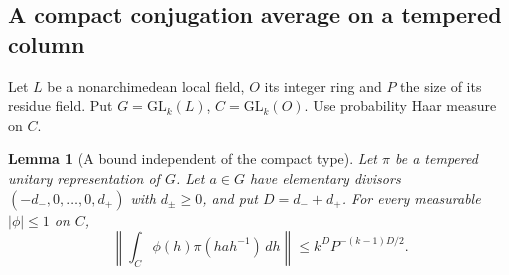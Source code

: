 \documentclass[a4paper,11pt]{article}
\newtheorem{lemma}[proposition]{Lemma}
\theoremstyle{definition}
\theoremstyle{remark}
\numberwithin{equation}{section}
\begin{document}
\subsection{A compact conjugation average on a tempered column}\label{nav:III-57}
Let \(L\) be a nonarchimedean local field, \(O\) its
integer ring and \(P\) the size of its residue field.
Put \(G=\mathrm{GL}_k(L)\), \(C=\mathrm{GL}_k(O)\).
Use probability Haar measure on \(C\).

\begin{lemma}[A bound independent of the compact type]\leavevmode
\label{lem:conjugation292}
Let \(\pi\) be a tempered unitary representation of \(G\).
Let \(a\in G\) have elementary divisors
\((-d_-,0,\ldots,0,d_+)\) with \(d_\pm\ge0\), and put
\(D=d_-+d_+\). For every measurable \(|\phi|\le1\) on \(C\),
\[
  \left\|\int_C\phi(h)\pi(hah^{-1})\,dh\right\|
           \le k^D P^{-(k-1)D/2}.
\]
\end{lemma}
\end{document}
